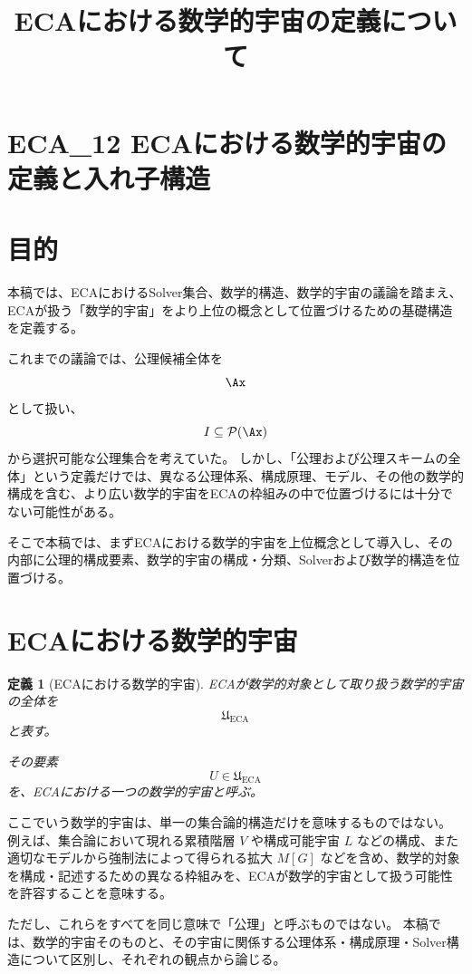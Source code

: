 \documentclass[11pt,a4paper]{article}
\title{ECAにおける数学的宇宙の定義について}
\author{}
\date{}
\newtheorem{definition}{定義}
\begin{document}
\maketitle

\section{ECA\_12 ECAにおける数学的宇宙の定義と入れ子構造}

\section{目的}

本稿では、ECAにおけるSolver集合、数学的構造、数学的宇宙の議論を踏まえ、ECAが扱う「数学的宇宙」をより上位の概念として位置づけるための基礎構造を定義する。

これまでの議論では、公理候補全体を
\[
\Ax
\]
として扱い、
\[
I\subseteq\mathcal{P}(\Ax)
\]
から選択可能な公理集合を考えていた。
しかし、「公理および公理スキームの全体」という定義だけでは、異なる公理体系、構成原理、モデル、その他の数学的構成を含む、より広い数学的宇宙をECAの枠組みの中で位置づけるには十分でない可能性がある。

そこで本稿では、まずECAにおける数学的宇宙を上位概念として導入し、その内部に公理的構成要素、数学的宇宙の構成・分類、Solverおよび数学的構造を位置づける。

\section{ECAにおける数学的宇宙}

\begin{definition}[ECAにおける数学的宇宙]
ECAが数学的対象として取り扱う数学的宇宙の全体を
\[
\mathfrak{U}_{\mathrm{ECA}}
\]
と表す。

その要素
\[
U\in\mathfrak{U}_{\mathrm{ECA}}
\]
を、ECAにおける一つの数学的宇宙と呼ぶ。
\end{definition}

ここでいう数学的宇宙は、単一の集合論的構造だけを意味するものではない。
例えば、集合論において現れる累積階層 $V$ や構成可能宇宙 $L$ などの構成、また適切なモデルから強制法によって得られる拡大 $M[G]$ などを含め、数学的対象を構成・記述するための異なる枠組みを、ECAが数学的宇宙として扱う可能性を許容することを意味する。

ただし、これらをすべてを同じ意味で「公理」と呼ぶものではない。
本稿では、数学的宇宙そのものと、その宇宙に関係する公理体系・構成原理・Solver構造について区別し、それぞれの観点から論じる。
\end{document}
